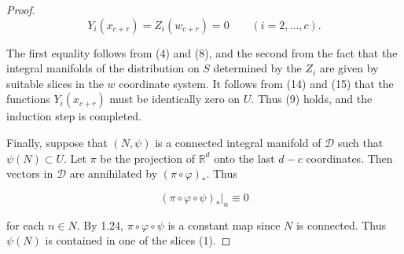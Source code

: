 \begin{proof}
	\begin{equation}
		\tag{15}\label{eq:1.60:15}
		Y_{i}(x_{c+r})=Z_{i}(w_{c+r})=0\qquad(i=2,\ldots,c).
	\end{equation}

	The first equality follows from (4) and (8), and the second from the fact that the integral manifolds of the distribution on $S$ determined by the $Z_{i}$ are given by suitable slices in the $w$ coordinate system. It follows from (14) and (15) that the functions $Y_{i}(x_{c+r})$ must be identically zero on $U$. Thus (9) holds, and the induction step is completed.

	Finally, suppose that $(N,\psi)$ is a connected integral manifold of $\mathcal{D}$ such that $\psi(N)\subset U$. Let $\pi$ be the projection of $\mathbb{R}^d$ onto the last $d-c$ coordinates. Then vectors in $\mathcal{D}$ are annihilated by $(\pi\circ\varphi)_{*}$. Thus

	\[
		(\pi\circ\varphi\circ\psi)_{*}|_{n}\equiv0
	\]

	for each $n \in N$. By 1.24, $\pi \circ \varphi \circ \psi$ is a constant map since $N$ is connected. Thus $\psi(N)$ is contained in one of the slices (1).

\end{proof}


